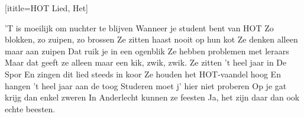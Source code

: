 \footnotemark

[ititle={HOT Lied, Het}]

\beginverse
'T is moeilijk om nuchter te blijven
Wanneer je student bent van HOT
Zo blokken, zo zuipen, zo brossen
Ze zitten haast nooit op hun kot
Ze denken alleen maar aan zuipen
Dat ruik je in een ogenblik
Ze hebben problemen met leraars
Maar dat geeft ze alleen maar een kik, zwik, zwik.
\endverse
\beginverse
Ze zitten 't heel jaar in De Spor
En zingen dit lied steeds in koor
Ze houden het HOT-vaandel hoog
En hangen 't heel jaar aan de toog
Studeren moet j' hier niet proberen
Op je gat krijg dan enkel zweren
In Anderlecht kunnen ze feesten
Ja, het zijn daar dan ook echte beesten.
\endverse
\endsong
